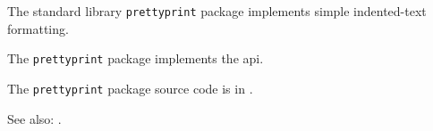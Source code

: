 
The standard library {\tt prettyprint} package implements simple indented-text formatting.

The {\tt prettyprint} package implements the  api.

The {\tt prettyprint} package source code is in .

See also: .
